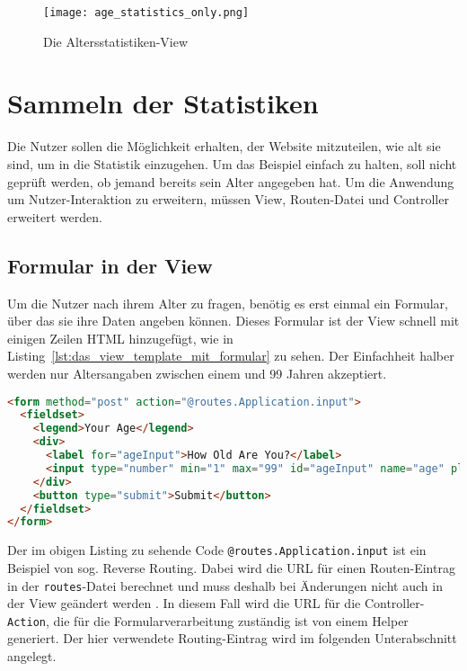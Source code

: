 \begin{figure}
\centering
\texttt{[image: age\_statistics\_only.png]}
\caption{Die Altersstatistiken-View}
\label{fig:die_altersstatistiken_view}
\end{figure}




\section{Sammeln der Statistiken} %
\label{sec:sammeln_der_statistiken}

Die Nutzer sollen die Möglichkeit erhalten, der Website mitzuteilen, wie alt sie sind, um in die Statistik einzugehen.
Um das Beispiel einfach zu halten, soll nicht geprüft werden, ob jemand bereits sein Alter angegeben hat.
Um die Anwendung um Nutzer-Interaktion zu erweitern, müssen View, Routen-Datei und Controller erweitert werden.

\subsection{Formular in der View} %
\label{sub:formular_in_der_view}

Um die Nutzer nach ihrem Alter zu fragen, benötig es erst einmal ein Formular, über das sie ihre Daten angeben können.
Dieses Formular ist der View schnell mit einigen Zeilen HTML hinzugefügt, wie in Listing~\ref{lst:das_view_template_mit_formular} zu sehen.
Der Einfachheit halber werden nur Altersangaben zwischen einem und 99 Jahren akzeptiert.

\begin{lstlisting}[language=html, caption=Das View-Template mit Formular, label=lst:das_view_template_mit_formular]
<form method="post" action="@routes.Application.input">
  <fieldset>
    <legend>Your Age</legend>
    <div>
      <label for="ageInput">How Old Are You?</label>
      <input type="number" min="1" max="99" id="ageInput" name="age" placeholder="Enter Age">
    </div>
    <button type="submit">Submit</button>
  </fieldset>
</form>
\end{lstlisting}

Der im obigen Listing zu sehende Code \lstinline|@routes.Application.input| ist ein Beispiel von sog. Reverse Routing.
Dabei wird die URL für einen Routen-Eintrag in der \lstinline|routes|-Datei berechnet und muss deshalb bei Änderungen nicht auch in der View geändert werden \cite[vgl.][S.~98--100]{play_for_scala}.
In diesem Fall wird die URL für die Controller-\lstinline|Action|, die für die Formularverarbeitung zuständig ist von einem Helper generiert.
Der hier verwendete Routing-Eintrag wird im folgenden Unterabschnitt angelegt.

